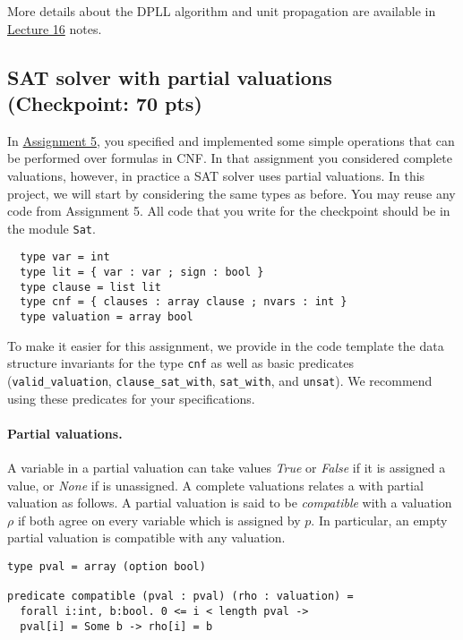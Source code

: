 \documentclass[11pt]{article}
\begin{document}
\medskip

More details about the DPLL algorithm and unit propagation are available in \href{https://www.cs.cmu.edu/~15414/lectures/16-satdpll.pdf}{Lecture 16} notes.

\subsection{SAT solver with partial valuations (Checkpoint: 70 pts)}

In \href{https://www.cs.cmu.edu/~15414/assignments/asst5.pdf}{Assignment 5}, you specified and implemented some simple operations that can be performed over formulas in CNF. In that assignment you considered complete valuations, however, in practice a SAT solver uses partial valuations. In this project, we will start by considering the same types as before. You may reuse any code from Assignment 5. All code that you write for the checkpoint should be in the module \texttt{Sat}.

\begin{lstlisting}
  type var = int
  type lit = { var : var ; sign : bool }
  type clause = list lit
  type cnf = { clauses : array clause ; nvars : int }
  type valuation = array bool
\end{lstlisting}

To make it easier for this assignment, we provide in the code template the data structure invariants for the type \texttt{cnf} as well as basic predicates (\texttt{valid\_valuation}, \texttt{clause\_sat\_with}, \texttt{sat\_with}, and \texttt{unsat}). We recommend using these predicates for your specifications.

\paragraph{Partial valuations.} A variable in a partial valuation can take values \emph{True} or \emph{False} if it is assigned a value, or \emph{None} if is unassigned. A complete valuations relates  a with partial valuation as follows. A partial valuation is said to be \emph{compatible} with a valuation $\rho$ if both agree on every variable which is assigned by $p$. In particular, an empty partial valuation is compatible with any valuation.

\begin{lstlisting}
type pval = array (option bool)

predicate compatible (pval : pval) (rho : valuation) =
  forall i:int, b:bool. 0 <= i < length pval ->
  pval[i] = Some b -> rho[i] = b
\end{lstlisting}
\end{document}
